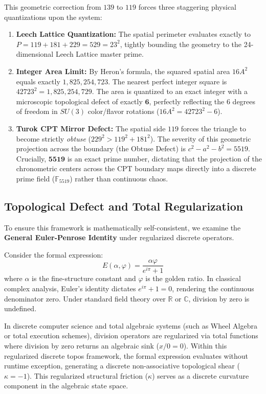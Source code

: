This geometric correction from $139$ to $119$ forces three staggering physical quantizations upon the system:
\begin{enumerate}
    \item \textbf{Leech Lattice Quantization:} The spatial perimeter evaluates exactly to $P = 119 + 181 + 229 = 529 = 23^2$, tightly bounding the geometry to the 24-dimensional Leech Lattice master prime.
    \item \textbf{Integer Area Limit:} By Heron's formula, the squared spatial area $16 A^2$ equals exactly $1,825,254,723$. The nearest perfect integer square is $42723^2 = 1,825,254,729$. The area is quantized to an exact integer with a microscopic topological defect of exactly $\mathbf{6}$, perfectly reflecting the 6 degrees of freedom in $SU(3)$ color/flavor rotations ($16A^2 = 42723^2 - 6$).
    \item \textbf{Turok CPT Mirror Defect:} The spatial side $119$ forces the triangle to become strictly \emph{obtuse} ($229^2 > 119^2 + 181^2$). The severity of this geometric projection across the boundary (the Obtuse Defect) is $c^2 - a^2 - b^2 = 5519$. Crucially, $\mathbf{5519}$ is an exact prime number, dictating that the projection of the chronometric centers across the CPT boundary maps directly into a discrete prime field ($\mathbb{F}_{5519}$) rather than continuous chaos.
\end{enumerate}

\subsection{Topological Defect and Total Regularization}
To ensure this framework is mathematically self-consistent, we examine the \textbf{General Euler-Penrose Identity} under regularized discrete operators.

Consider the formal expression:
\[ E(\alpha, \varphi) = \frac{\alpha \varphi}{e^{i\pi} + 1} \]
where $\alpha$ is the fine-structure constant and $\varphi$ is the golden ratio. In classical complex analysis, Euler's identity dictates $e^{i\pi} + 1 = 0$, rendering the continuous denominator zero. Under standard field theory over $\mathbb{R}$ or $\mathbb{C}$, division by zero is undefined.

In discrete computer science and total algebraic systems (such as Wheel Algebra or total execution schemes), division operators are regularized via total functions where division by zero returns an algebraic sink ($x / 0 = 0$). Within this regularized discrete topos framework, the formal expression evaluates without runtime exception, generating a discrete non-associative topological shear ($\kappa = -1$). This regularized structural friction ($\kappa$) serves as a discrete curvature component in the algebraic state space.

